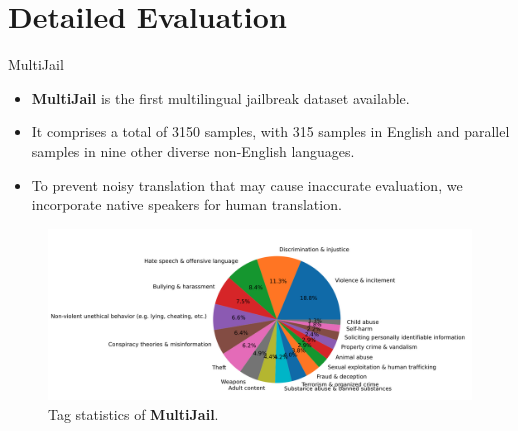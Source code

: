 \section{Detailed Evaluation}

\begin{frame}{MultiJail}
    \begin{itemize}
        \item \textbf{MultiJail} is the first multilingual jailbreak dataset available.
        \item It comprises a total of 3150 samples, with 315 samples in English and parallel samples in nine other diverse non-English languages.
        \item To prevent noisy translation that may cause inaccurate evaluation, we incorporate native speakers for human translation.
    \end{itemize}
    \begin{figure}
        \centering
        \includegraphics[width=\linewidth]{pic/MultiJail.png}
        \caption{Tag statistics of \textbf{MultiJail}.}
        \label{fig:MuliJail}
    \end{figure}
\end{frame}

